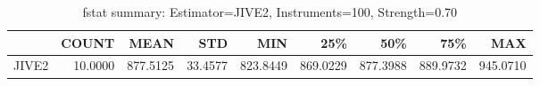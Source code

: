 \begin{table}[ht]
\centering
\caption{fstat summary: Estimator=JIVE2, Instruments=100, Strength=0.70}
\begin{tabular}{lrrrrrrrr}
\toprule
 & COUNT & MEAN & STD & MIN & 25\% & 50\% & 75\% & MAX \\
\midrule
JIVE2 & 10.0000 & 877.5125 & 33.4577 & 823.8449 & 869.0229 & 877.3988 & 889.9732 & 945.0710 \\
\bottomrule
\end{tabular}
\end{table}
